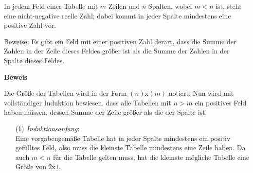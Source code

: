 \documentclass[10pt, a4paper, reqno]{amsart}
\makeatletter
\renewcommand\proofname{Beweis}
\renewenvironment{proof}[1][\proofname]{\par
\pushQED{\qed}%
\normalfont \topsep6\p@\@plus6\p@\relax
\trivlist
\item\relax
{\bfseries#1}\hspace\labelsep\ignorespaces
}{%
\popQED\endtrivlist\@endpefalse
}
\makeatother
\begin{document}
\newpage
\begin{aufgabe}
  In jedem Feld einer Tabelle mit $m$ Zeilen und $n$ Spalten, wobei $m < n$ ist,
  steht eine nicht-negative reelle Zahl; dabei kommt in jeder Spalte mindestens
  eine positive Zahl vor.
  
  Beweise: Es gibt ein Feld mit einer positiven Zahl derart, dass die Summe der
  Zahlen in der Zeile dieses Feldes größer ist als die Summe der Zahlen in der
  Spalte dieses Feldes.
\end{aufgabe}
\begin{proof}
  Die Größe der Tabellen wird in der Form $(n)\text{x}(m)$ notiert. Nun wird
  mit vollständiger Induktion bewiesen, dass alle Tabellen mit $n > m$ ein positives Feld
  haben müssen, dessen Summe der Zeile größer als die der Spalte ist:
  \begin{itemize}[itemsep=2ex]
  \item[(1)]\emph{Induktionsanfang}:\\
    Eine vorgabengemäße Tabelle hat in jeder Spalte mindestens ein positiv
    gefülltes Feld, also muss die kleinste Tabelle mindestens eine Zeile haben.
    Da auch $m<n$ für die Tabelle gelten muss, hat die kleinste mögliche Tabelle
    eine Größe von $2\text{x}1$.


\end{itemize}
\end{proof}
\end{document}

